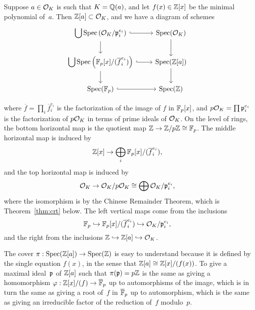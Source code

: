 Suppose $a\in\mathcal{O}_K$ is such that $K=\mathbb{Q}(a)$, and let $f(x) \in \mathbb{Z}[x]$
be the minimal polynomial of~$a$. Then $\mathbb{Z}[a]\subset \mathcal{O}_K$, and
we have a diagram of schemes
$$
	\begin{tikzcd}
		\displaystyle\bigcup\Spec\left(\O_K/\p_i^{e_i}\right) \ar[r,hook] \ar[d] & \Spec(\O_K) \ar[d]
		\\
		\displaystyle\bigcup\Spec\left(\F_p[x]/(\overline{f}_i^{e_i})\right) \ar[r,hook] \ar[d] & \Spec(\Z[a]) \ar[d]
		\\
		\Spec(\F_p) \ar[r,hook] & \Spec(\Z)
	\end{tikzcd}
$$

where $\overline{f} = \prod_i \overline{f}_i^{e_i}$ is the factorization of the
image of $f$ in $\mathbb{F}_p[x]$, and $p\mathcal{O}_K = \prod \mathfrak{p}_i^{e_i}$ is the factorization
of $p\mathcal{O}_K$ in terms of prime ideals of $\mathcal{O}_K$. On the level of rings, the
bottom horizontal map is the quotient map $\mathbb{Z}\to\mathbb{Z}/p\mathbb{Z}\cong \mathbb{F}_p$.
The middle horizontal map is induced by
$$
	\mathbb{Z}[x] \to \bigoplus_i \mathbb{F}_p[x]/(\overline{f}_i^{e_i}),
$$
and the top horizontal map is induced by
$$
	\mathcal{O}_K \to \mathcal{O}_K/p\mathcal{O}_K \cong \bigoplus \mathcal{O}_K/\mathfrak{p}_i^{e_i},
$$
where the isomorphism is by the Chinese Remainder Theorem,
which is Theorem~\ref{thm:crt} below.
The left vertical maps come from the inclusions
$$
   \mathbb{F}_p \hookrightarrow \mathbb{F}_p[x]/(\overline{f}_i^{e_i}) \hookrightarrow \mathcal{O}_K/\mathfrak{p}_i^{e_i},
$$
and the right from the inclusions $\mathbb{Z}\hookrightarrow\mathbb{Z}[a]\hookrightarrow\mathcal{O}_K$.

The cover $\pi:\operatorname{Spec}(\mathbb{Z}[a])\rightarrow \operatorname{Spec}(\mathbb{Z})$ is easy to understand because it is
defined by the single equation $f(x)$,
in the sense that $\mathbb{Z}[a]\cong \mathbb{Z}[x]/(f(x))$.
To give a maximal ideal~$\mathfrak{p}$ of $\mathbb{Z}[a]$ such that $\pi(\mathfrak{p}) = p\mathbb{Z}$ is the same
as giving a homomorphism $\varphi:\mathbb{Z}[x]/(f) \rightarrow \overline{\mathbb{F}}_p$ up to automorphisms of
the image, which is in turn the same as giving a root of~$f$ in $\overline{\mathbb{F}}_p$ up
to automorphism, which is the same as giving an irreducible factor of the
reduction of~$f$ modulo~$p$.

